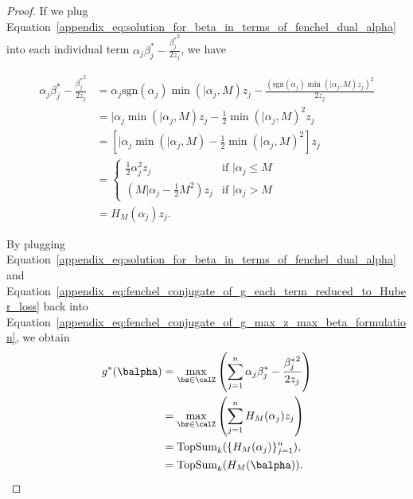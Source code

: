 \begin{proof}
    If we plug Equation~\eqref{appendix_eq:solution_for_beta_in_terms_of_fenchel_dual_alpha} into each individual term $\alpha_j \beta_j^* - \frac{{\beta_j^*}^2}{2z_j}$, we have

    \begin{align}
        \label{appendix_eq:fenchel_conjugate_of_g_each_term_reduced_to_Huber_loss}
        \alpha_j \beta_j^* - \frac{{\beta_j^*}^2}{2z_j} &= \alpha_j \text{sgn}(\alpha_j) \min(\vert{\alpha_j}, M) z_j - \frac{\left( \text{sgn}\left( \alpha_j \right) \min\left(\vert{\alpha_j}, M \right) z_j \right)^2}{2z_j} \nonumber \\
        &= \vert{\alpha_j} \min(\vert{\alpha_j}, M) z_j - \frac{1}{2} \min(\vert{\alpha_j}, M)^2 z_j \nonumber \\
        &= \left[ \vert{\alpha_j} \min(\vert{\alpha_j}, M) - \frac{1}{2} \min(\vert{\alpha_j}, M)^2 \right] z_j \nonumber \\
        &= \begin{cases}
            \frac{1}{2} \alpha_j^2 z_j & \text{if } \vert{\alpha_j} \leq M \nonumber \\
            \left( M \vert{\alpha_j} - \frac{1}{2} M^2 \right) z_j & \text{if } \vert{\alpha_j} > M
        \end{cases} \nonumber \\
        &= H_M(\alpha_j) z_j.
    \end{align}

    By plugging Equation~\eqref{appendix_eq:solution_for_beta_in_terms_of_fenchel_dual_alpha} and Equation~\eqref{appendix_eq:fenchel_conjugate_of_g_each_term_reduced_to_Huber_loss} back into Equation~\eqref{appendix_eq:fenchel_conjugate_of_g_max_z_max_beta_formulation}, we obtain
    \begin{align*}
        g^*(\balpha) &= \max_{\bz \in \calZ} \left( \sum_{j=1}^n \alpha_j \beta_j^* - \frac{ {\beta_j^*}^2}{2z_j} \right)\\
        &= \max_{\bz \in \calZ} \left( \sum_{j=1}^n H_M(\alpha_j) z_j \right) \nonumber\\
        &= \text{TopSum}_k (\{H_M(\alpha_j)\}_{j=1}^n), \nonumber \\
        &= \text{TopSum}_k (H_M(\balpha)).
    \end{align*}
\end{proof}


